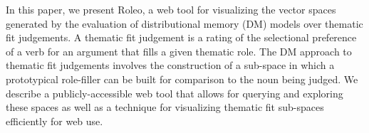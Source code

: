 In this paper, we present Roleo, a web tool for visualizing the vector spaces generated by the evaluation of distributional memory (DM) models over thematic fit judgements.  A thematic fit judgement is a rating of the selectional preference of a verb for an argument that fills a given thematic role.  The DM approach to thematic fit judgements involves the construction of a sub-space in which a prototypical role-filler can be built for comparison to the noun being judged.  We describe a publicly-accessible web tool that allows for querying and exploring these spaces as well as a technique for visualizing thematic fit sub-spaces efficiently for web use.
